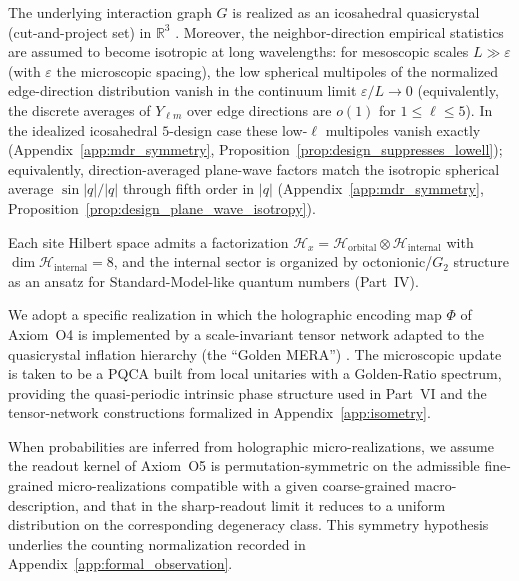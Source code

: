 \begin{assumption}
\label{assump:M1}
The underlying interaction graph $G$ is realized as an icosahedral quasicrystal (cut-and-project set) in $\mathbb{R}^3$ \cite{LevineSteinhardt1984,Senechal1995,BaakeGrimm2013AperiodicOrder}. Moreover, the neighbor-direction empirical statistics are assumed to become isotropic at long wavelengths: for mesoscopic scales $L\gg \varepsilon$ (with $\varepsilon$ the microscopic spacing), the low spherical multipoles of the normalized edge-direction distribution vanish in the continuum limit $\varepsilon/L\to 0$ (equivalently, the discrete averages of $Y_{\ell m}$ over edge directions are $o(1)$ for $1\le \ell\le 5$). In the idealized icosahedral $5$-design case these low-$\ell$ multipoles vanish exactly (Appendix~\ref{app:mdr_symmetry}, Proposition~\ref{prop:design_suppresses_lowell}); equivalently, direction-averaged plane-wave factors match the isotropic spherical average $\sin|q|/|q|$ through fifth order in $|q|$ (Appendix~\ref{app:mdr_symmetry}, Proposition~\ref{prop:design_plane_wave_isotropy}).
\end{assumption}

\begin{assumption}
\label{assump:M2}
Each site Hilbert space admits a factorization $\mathcal{H}_x = \mathcal{H}_{\mathrm{orbital}}\otimes \mathcal{H}_{\mathrm{internal}}$ with $\dim \mathcal{H}_{\mathrm{internal}}=8$, and the internal sector is organized by octonionic/$G_2$ structure as an ansatz for Standard-Model-like quantum numbers (Part~IV).
\end{assumption}

\begin{assumption}
\label{assump:M3}
We adopt a specific realization in which the holographic encoding map $\Phi$ of Axiom~O4 is implemented by a scale-invariant tensor network adapted to the quasicrystal inflation hierarchy (the ``Golden MERA'') \cite{Vidal2007MERA,Swingle2012MERA}. The microscopic update is taken to be a PQCA built from local unitaries with a Golden-Ratio spectrum, providing the quasi-periodic intrinsic phase structure used in Part~VI and the tensor-network constructions formalized in Appendix~\ref{app:isometry}.
\end{assumption}

\begin{assumption}
\label{assump:S1}
When probabilities are inferred from holographic micro-realizations, we assume the readout kernel of Axiom~O5 is permutation-symmetric on the admissible fine-grained micro-realizations compatible with a given coarse-grained macro-description, and that in the sharp-readout limit it reduces to a uniform distribution on the corresponding degeneracy class. This symmetry hypothesis underlies the counting normalization recorded in Appendix~\ref{app:formal_observation}.
\end{assumption}

